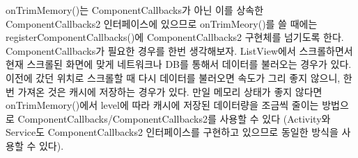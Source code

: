 onTrimMemory()는 ComponentCallbacks가 아닌 이를 상속한 ComponentCallbacks2 인터페이스에 있으므로 onTrimMeory()를 쓸 때에는 registerComponentCallbacks()에 ComponentCallbacks2 구현체를 넘기도록 한다.\\

ComponentCallbacks가 필요한 경우를 한번 생각해보자.
ListView에서 스크롤하면서 현재 스크롤된 화면에 맞게 네트워크나 DB를 통해서 데이터를 불러오는 경우가 있다. 이전에 갔던 위치로 스크롤할 때 다시 데이터를 불러오면 속도가 그리 좋지 않으니, 한번 가져온 것은 캐시에 저장하는 경우가 있다.
만일 메모리 상태가 좋지 않다면 onTrimMemory()에서 level에 따라 캐시에 저장된 데이터량을 조금씩 줄이는 방법으로 ComponentCallbacks/ComponentCallbacks2를 사용할 수 있다
(Activity와 Service도 ComponentCallbacks2 인터페이스를 구현하고 있으므로 동일한 방식을 사용할 수 있다).\\

